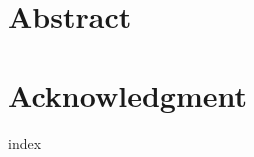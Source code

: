 \chapter{Abstract}
\label{frontmatter:abstract}


\chapter{Acknowledgment}
\label{frontmatter:acknowledgment}


\tableofcontents

{index}
